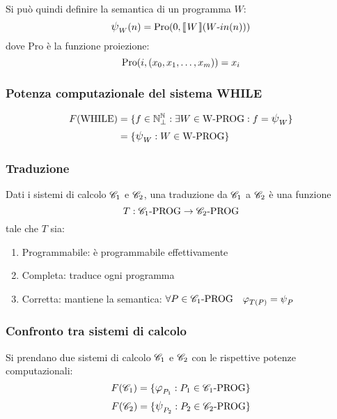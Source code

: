 Si può quindi definire la semantica di un programma $W$:
$$\semWHILE_W(n) = \Pro(0,\opsemWHILE{W}{\text{$W$-$in$}(n)})$$
dove Pro è la funzione proiezione:
$$ \text{Pro}(i,(x_0,x_1,\dots,x_m)) = x_i $$

\subsubsection*{Potenza computazionale del sistema WHILE}
$$ \begin{aligned}
    F(\text{WHILE}) &= \{ f\in\N^\N_\perp : \exists W\in \text{W-PROG}:f=\semWHILE_W \}\\
    &= \{ \semWHILE_W : W \in \text{W-PROG} \} 
    \end{aligned}
$$

\subsubsection{Traduzione}
Dati i sistemi di calcolo $\mathscr{C}_1$ e $\mathscr{C}_2$, una traduzione da $\mathscr{C}_1$ a $\mathscr{C}_2$ è una funzione
$$ T:\mathscr{C}_1\text{-PROG}\to\mathscr{C}_2\text{-PROG} $$
tale che $T$ sia:
\begin{enumerate}
    \item Programmabile: è programmabile effettivamente
    \item Completa: traduce ogni programma
    \item Corretta: mantiene la semantica:
        $\forall P\in\SC_1\text{-PROG} \quad \semRAM_{T(P)}=\semWHILE_{P}$
\end{enumerate}
\subsubsection{Confronto tra sistemi di calcolo}
Si prendano due sistemi di calcolo $\mathscr{C}_1$ e $\mathscr{C}_2$ con le rispettive potenze computazionali:
$$ F(\SC_1) = \{\semRAM_{P_1}:P_1\in\SC_1\text{-PROG}\} $$
$$ F(\SC_2) = \{\semWHILE_{P_2}:P_2\in\SC_2\text{-PROG}\} $$

